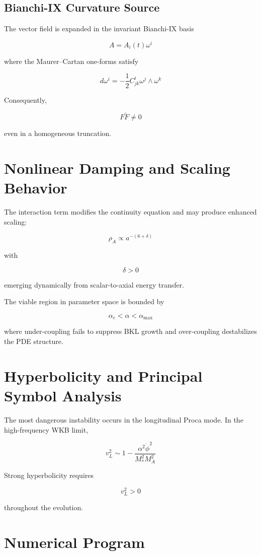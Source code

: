 \documentclass[11pt]{article}
\begin{document}
\subsection{Bianchi-IX Curvature Source}

The vector field is expanded in the invariant Bianchi-IX basis

\[
A = A_i(t)\omega^i
\]

where the Maurer--Cartan one-forms satisfy

\[
d\omega^i
=
-\frac12
C^i_{jk}
\omega^j \wedge \omega^k
\]

Consequently,

\[
F\tilde F \neq 0
\]

even in a homogeneous truncation.

\section{Nonlinear Damping and Scaling Behavior}

The interaction term modifies the continuity equation and may produce enhanced scaling:

\[
\rho_A \propto a^{-(6+\delta)}
\]

with

\[
\delta > 0
\]

emerging dynamically from scalar-to-axial energy transfer.

The viable region in parameter space is bounded by

\[
\alpha_c < \alpha < \alpha_{\max}
\]

where under-coupling fails to suppress BKL growth and over-coupling destabilizes the PDE structure.

\section{Hyperbolicity and Principal Symbol Analysis}

The most dangerous instability occurs in the longitudinal Proca mode. In the high-frequency WKB limit,

\[
v_L^2
\sim
1
-
\frac{\alpha^2 \dot\phi^2}
{M_*^2 M_A^2}
\]

Strong hyperbolicity requires

\[
v_L^2 > 0
\]

throughout the evolution.

\section{Numerical Program}
\end{document}
